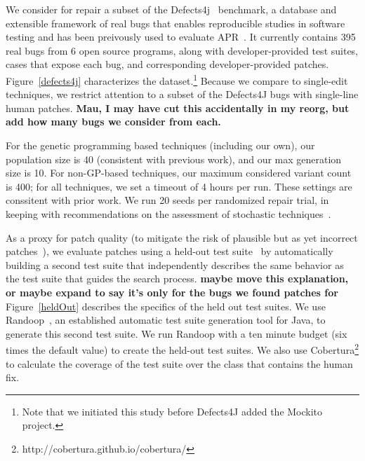 \documentclass[conference]{IEEEtran}
\newcommand{\todo}[1]
  {{\scriptsize \textbf{\color{red} {#1}}}}
\begin{document}
\vspace{1ex}
We consider for repair a subset of the Defects4j~\cite{just14}
benchmark, a database and extensible 
framework of real bugs that enables reproducible studies in software testing and
has been preivously used to evaluate APR~\cite{Duriux15}. 
It currently contains 395 real bugs from 6
open source programs, along with developer-provided test suites, cases that
expose each bug,  and
corresponding developer-provided patches.  Figure~\ref{defects4j} characterizes
the dataset.\footnote{Note that we initiated this study before Defects4J added
  the Mockito project.} Because we compare to single-edit techniques, we
restrict attention to a subset of the Defects4J bugs with single-line human
patches. \todo{Mau, I may have cut this accidentally in my reorg, but add how
  many bugs we consider from each.}

For the genetic programming based techniques (including our own), our population
size is 40 (consistent with previous work), and our max generation size is 10.
For non-GP-based techniques, our maximum considered variant count is 400; for
all techniques, we set a timeout of 4 hours per run.  These settings are
conssitent with prior work.  We run 20 seeds per randomized repair trial, in
keeping with recommendations on the assessment of stochastic
techniques~\cite{arcuri11}.

As a proxy for patch quality (to mitigate the risk of plausible but as yet
incorrect patches~\cite{Qi15}), we evaluate patches using a held-out test
suite~\cite{legoues12GenProg,smith15} by automatically building a second test
suite that independently describes the same behavior as the test suite that
guides the search process.  \todo{maybe move this explanation, or maybe expand
  to say it's only for the bugs we found patches for} Figure~\ref{heldOut} describes the specifics of the
held out test suites. We use Randoop~\cite{pacheco07}, an established automatic
test suite generation tool for Java, to generate this second test suite. We run
Randoop with a ten minute budget (six times the default value) to create the
held-out test suites. We also use
Cobertura\footnote{http://cobertura.github.io/cobertura/} to calculate the
coverage of the test suite over the class that contains the human fix.
\end{document}
